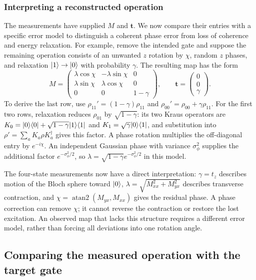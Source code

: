 \subsubsection{Interpreting a reconstructed operation}
The measurements have supplied $M$ and $\mathbf t$. We now compare
their entries with a specific error model to distinguish a coherent
phase error from loss of coherence and energy relaxation.
For example, remove the intended gate and suppose the remaining
operation consists of an unwanted $z$ rotation by $\chi$, random
$z$ phases, and relaxation $\lvert 1\rangle\to\lvert 0\rangle$ with probability
$\gamma$. The resulting map has the form
\begin{equation}
 M=\begin{pmatrix}
 \lambda\cos\chi&-\lambda\sin\chi&0\\
 \lambda\sin\chi& \lambda\cos\chi&0\\
 0&0&1-\gamma
 \end{pmatrix},\qquad
 \mathbf t=\begin{pmatrix}0\\0\\\gamma\end{pmatrix}.
 \label{eq:calibration-channel-diagnosis}
\end{equation}
To derive the last row, use
$\rho_{11}'=(1-\gamma)\rho_{11}$ and
$\rho_{00}'=\rho_{00}+\gamma\rho_{11}$.
For the first two rows, relaxation reduces $\rho_{01}$ by
$\sqrt{1-\gamma}$: its two Kraus operators are
$K_0=\lvert 0\rangle\langle 0\rvert+\sqrt{1-\gamma}\lvert 1\rangle\langle 1\rvert$ and
$K_1=\sqrt\gamma\lvert 0\rangle\langle 1\rvert$, and substitution into
$\rho'=\sum_a K_a\rho K_a^\dagger$ gives this factor.
A phase rotation multiplies the off-diagonal entry by
$e^{-i\chi}$. An independent Gaussian phase with variance
$\sigma_\phi^2$ supplies the additional factor
$e^{-\sigma_\phi^2/2}$, so
$\lambda=\sqrt{1-\gamma}e^{-\sigma_\phi^2/2}$ in this model.

The four-state measurements now have a direct interpretation:
$\gamma=t_z$ describes motion of the Bloch sphere toward $\lvert 0\rangle$,
$\lambda=\sqrt{M_{xx}^2+M_{yx}^2}$ describes transverse contraction,
and $\chi=\operatorname{atan2}(M_{yx},M_{xx})$ gives the residual
phase. A phase correction can remove $\chi$; it cannot reverse
the contraction or restore the lost excitation. An observed map
that lacks this structure requires a different error model,
rather than forcing all deviations into one rotation angle.

\subsection{Comparing the measured operation with the target gate}
\label{sec:calibration-gate-fidelity}

